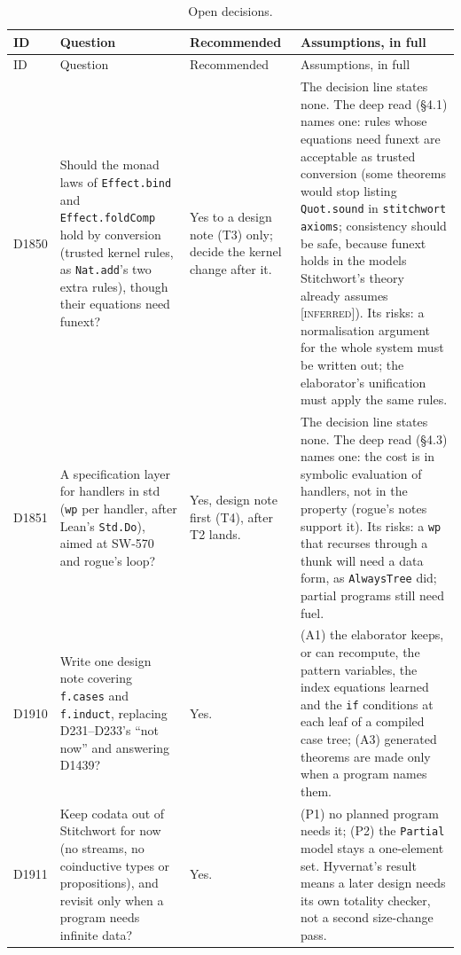 \documentclass[11pt,a4paper]{article}
\newcommand{\code}[1]{\texttt{#1}}
\newcommand{\inferred}{\textsc{[inferred]}}
\begin{document}
{\small
\begin{longtable}{@{}L{1.1cm}L{4.1cm}L{2.5cm}L{7.15cm}@{}}
\caption{Open decisions.}\label{tab:decisions}\\
\toprule
ID & Question & Recommended & Assumptions, in full \\
\midrule
\endfirsthead
\toprule
ID & Question & Recommended & Assumptions, in full \\
\midrule
\endhead
\bottomrule
\endfoot
D1850 & Should the monad laws of \code{Effect.bind} and \code{Effect.foldComp} hold by conversion
(trusted kernel rules, as \code{Nat.add}'s two extra rules), though their equations need funext? &
Yes to a design note (T3) only; decide the kernel change after it. &
The decision line states none. The deep read (\S4.1) names one: rules whose equations need
funext are acceptable as trusted conversion (some theorems would stop listing \code{Quot.sound}
in \code{stitchwort axioms}; consistency should be safe, because funext holds in the models
Stitchwort's theory already assumes \inferred). Its risks: a normalisation argument for the
whole system must be written out; the elaborator's unification must apply the same rules. \\
\addlinespace
D1851 & A specification layer for handlers in std (\code{wp} per handler, after Lean's
\code{Std.Do}), aimed at SW-570 and rogue's loop? &
Yes, design note first (T4), after T2 lands. &
The decision line states none. The deep read (\S4.3) names one: the cost is in symbolic
evaluation of handlers, not in the property (rogue's notes support it). Its risks: a \code{wp}
that recurses through a thunk will need a data form, as \code{AlwaysTree} did; partial programs
still need fuel. \\
\addlinespace
D1910 & Write one design note covering \code{f.cases} and \code{f.induct}, replacing D231--D233's
``not now'' and answering D1439? &
Yes. &
(A1) the elaborator keeps, or can recompute, the pattern variables, the index equations learned
and the \code{if} conditions at each leaf of a compiled case tree; (A3) generated theorems are
made only when a program names them. \\
\addlinespace
D1911 & Keep codata out of Stitchwort for now (no streams, no coinductive types or propositions),
and revisit only when a program needs infinite data? &
Yes. &
(P1) no planned program needs it; (P2) the \code{Partial} model stays a one-element set.
Hyvernat's result means a later design needs its own totality checker, not a second size-change
pass. \\

\end{longtable}}
\end{document}
